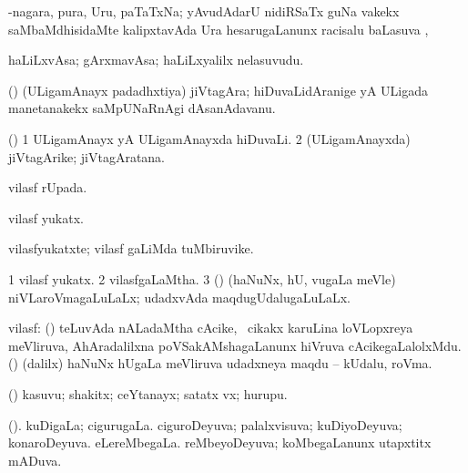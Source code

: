 \bentry
{} 
\gl{\aupa}
\expl{}
\bmng
 -nagara, pura, Uru, paTaTxNa; yAvudAdarU nidiRSaTx guNa \mo vakekx saMbaMdhisidaMte kalipxtavAda Ura hesarugaLanunx racisalu baLasuva \saupa, \udA\  
\emng
\eentry

\bentry
{}
\gl{\nA}
\expl{\It\ }
\bmng
haLiLxvAsa; gArxmavAsa; haLiLxyalilx nelasuvudu. 
\emng
\eentry

\bentry
{} 
\gl{\nA}
\expl{}
\bmng
 (\ca) (ULigamAnayx padadhxtiya) jiVtagAra; hiDuvaLidAranige yA ULigada manetanakekx saMpUNaRnAgi dAsanAdavanu. 
\emng
\eentry

\bentry
{} 
\gl{\nA}
\expl{}
\bmng
 (\ca) 
\bnum
\num{1} ULigamAnayx yA ULigamAnayxda hiDuvaLi. 
\num{2} (ULigamAnayxda) jiVtagArike; jiVtagAratana. 
\enum
\emng
\eentry

\bentry
{} 
\gl{\gu}
\expl{}
\bmng
 vilasf rUpada. 
\emng
\eentry

\bentry
{} 
\gl{\gu}
\expl{}
\bmng
 vilasf  yukatx. 
\emng
\eentry

\bentry
{} 
\gl{\nA}
\expl{}
\bmng
 vilasfyukatxte; vilasf  gaLiMda tuMbiruvike. 
\emng
\eentry

\bentry
{} 
\gl{\gu}
\expl{}
\bmng
\bnum
\num{1} vilasf yukatx. 
\num{2} vilasfgaLaMtha. 
\num{3} (\savi) (haNuNx, hU, \mo vugaLa meVle) niVLaroVmagaLuLaLx; udadxvAda maqdugUdalugaLuLaLx. 
\enum
\emng
\eentry

\bentry
{} 
\gl{\nA}
\bmng
 vilasf: 
\banum
{} (\aMrashA) teLuvAda nALadaMtha cAcike, \udA\ cikakx karuLina loVLopxreya meVliruva, AhAradalilxna poVSakAMshagaLanunx hiVruva cAcikegaLalolxMdu. 
 (\savi) (\bava dalilx) haNuNx hUgaLa meVliruva udadxneya maqdu -- kUdalu, roVma. 
\eanum
\emng
\eentry

\bentry
{} 
\gl{\nA}
\expl{}
\bmng
 (\AmA) kasuvu; shakitx; ceYtanayx; satatx vx; hurupu. 
\emng
\eentry

\bentry
{} 
\gl{\gu}
\expl{}
\bmng
\bnum
{}(\savi). 
\banum
{} kuDigaLa; cigurugaLa. 
 ciguroDeyuva; palalxvisuva; kuDiyoDeyuva; konaroDeyuva. 
\eanum
\numie
{} 
\banum
{} eLereMbegaLa. 
 reMbeyoDeyuva; koMbegaLanunx utapxtitx mADuva. 
\eanum
\numie
\enum
\emng
\eentry

